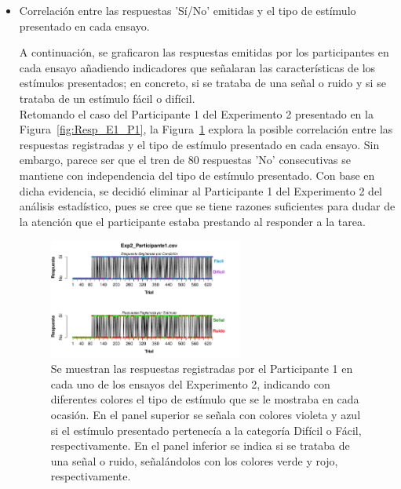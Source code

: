 \begin{itemize}

\item Correlación entre las respuestas 'Sí/No' emitidas y el tipo de estímulo presentado en cada ensayo.

A continuación, se graficaron las respuestas emitidas por los participantes en cada ensayo añadiendo indicadores que señalaran las características de los estímulos presentados; en concreto, si se trataba de una señal o ruido y si se trataba de un estímulo fácil o difícil.\\ 

Retomando el caso del Participante 1 del Experimento 2 presentado en la Figura~\ref{fig:Resp_E1_P1}, la Figura~\ref{fig:BiasResp_E1_P1} explora la posible correlación entre las respuestas registradas y el tipo de estímulo presentado en cada ensayo. Sin embargo, parece ser que el tren de 80 respuestas 'No' consecutivas se mantiene con independencia del tipo de estímulo presentado. Con base en dicha evidencia, se decidió eliminar al Participante 1 del Experimento 2 del análisis estadístico, pues se cree que se tiene razones suficientes para dudar de la atención que el participante estaba prestando al responder a la tarea.\\

\begin{figure}[th]
\centering
\includegraphics[width=0.60\textwidth]{Figures/BiasResp_Exp2_P1} 
\caption[Respuesta por Tipo de Estimulo; ejemplo de participante sesgado]{Se muestran las respuestas registradas por el Participante 1 en cada uno de los ensayos del Experimento 2, indicando con diferentes colores el tipo de estímulo que se le mostraba en cada ocasión. En el panel superior se señala con colores violeta y azul si el estímulo presentado pertenecía a la categoría Difícil o Fácil, respectivamente. En el panel inferior se indica si se trataba de una señal o ruido, señalándolos con los colores verde y rojo, respectivamente.}
\label{fig:BiasResp_E1_P1}
\end{figure}


\end{itemize}
